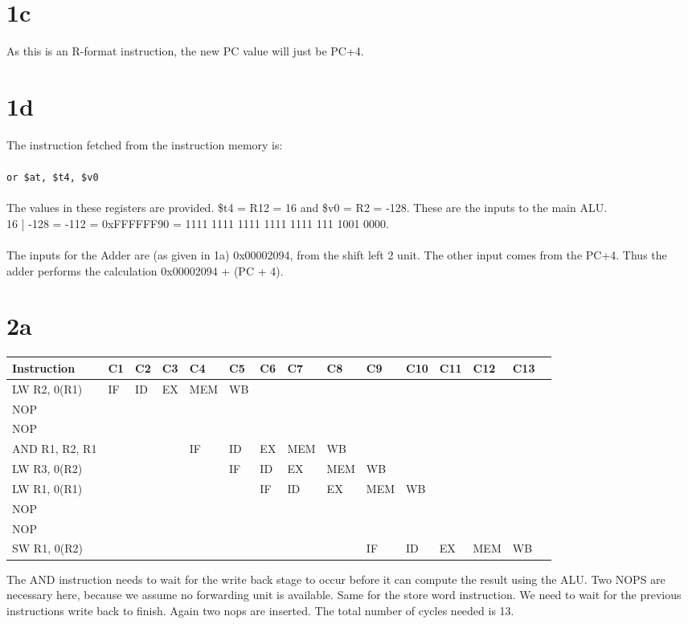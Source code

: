 \documentclass[10pt,a4paper]{article}
\begin{document}
	\section*{1c}
	As this is an R-format instruction, the new PC value will just be PC+4.
	\section*{1d}
	The instruction fetched from the instruction memory is: \\\\
	\verb|or $at, $t4, $v0| \\\\
	The values in these registers are provided. \$t4 = R12 = 16 and \$v0 = R2 = -128. These are the inputs to the main ALU.\\
	16 | -128 = -112 = 0xFFFFFF90 = 1111 1111 1111 1111 1111 111 1001 0000.\\\\
	The inputs for the Adder are (as given in 1a) 0x00002094, from the shift left 2 unit. The other input comes from the PC+4. Thus the adder performs the calculation 0x00002094 + (PC + 4).
	\section*{2a}
	\begin{table}[h]
		\centering
		\label{my-label}
		\begin{tabular}{|l|l|l|l|l|l|l|l|l|l|l|l|l|l|l|}
			\hline
			Instruction & C1  & C2  & C3  & C4  & C5  &C6  &C7  & C8  & C9  & C10 & C11 & C12 & C13   \\ \hline
			LW R2, 0(R1) & IF  & ID  & EX  & MEM  & WB  &  &  &  &  &  &  &  &   \\ \hline
			NOP &  &  &  &  &  &  &  &  &  &  &  &  &    \\ \hline
			NOP &  &  &  &  &  &  &  &  &  &  &  &  &    \\ \hline
			AND R1, R2, R1 &  &  &  & IF& ID  & EX  & MEM & WB &  &  &  &  &    \\ \hline
			LW R3, 0(R2)&  &  &  &  &  IF & ID  & EX & MEM & WB &  &  &  &    \\ \hline
			LW R1, 0(R1)&  &  &  &  &  & IF & ID & EX & MEM  & WB  &  &  &  \\ \hline
			NOP &  &  &  &  &  &  &  &  &  &  &  &  &    \\ \hline
			NOP&  &  &  &  &  &  &  &  &  &  &  &  &    \\ \hline
			SW R1, 0(R2)&  &  &  &  &  &  &  &  & IF & ID & EX  & MEM  & WB    \\ \hline
		\end{tabular}
	\end{table}
\noindent	The AND instruction needs to wait for the write back stage to occur before it can compute the result using the ALU. Two NOPS are necessary here, because we assume no forwarding unit is available. Same for the store word instruction. We need to wait for the previous instructions write back to finish. Again two nops are inserted. The total number of cycles needed is 13.
\end{document}
